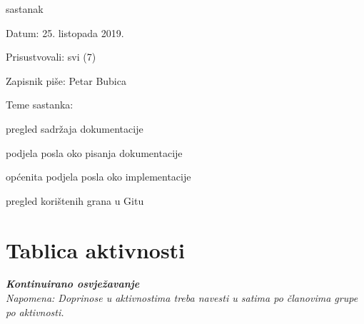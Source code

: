 \begin{packed_enum}
			\pagebreak

			\item  sastanak
			\item[] \begin{packed_item}
				\item Datum: 25. listopada 2019.
				\item Prisustvovali: svi (7)
				\item Zapisnik piše: Petar Bubica
				\item Teme sastanka:
				\begin{packed_item}
					\item pregled sadržaja dokumentacije
					\item podjela posla oko pisanja dokumentacije
					\item općenita podjela posla oko implementacije
					\item pregled korištenih grana u Gitu
				\end{packed_item}
			\end{packed_item}
			
			
		\end{packed_enum}
		
		\eject
		\section*{Tablica aktivnosti}
		
			\textbf{\textit{Kontinuirano osvježavanje}}\\
			
			 \textit{Napomena: Doprinose u aktivnostima treba navesti u satima po članovima grupe po aktivnosti.}
					
